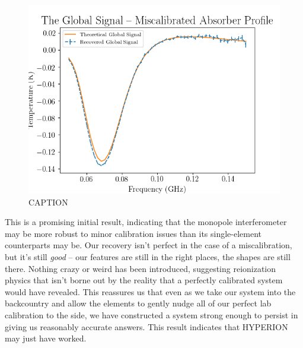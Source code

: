 \begin{figure}
    \begin{center}
    \includegraphics[width=\linewidth]{recovered_signal_diff_abs.png}
    \end{center}
    \caption{
        CAPTION
    }
    \label{fig:recovered-mismatched}
\end{figure}

This is a promising initial result, indicating that the monopole interferometer 
may be more robust to minor calibration issues than its single-element 
counterparts may be. Our recovery isn't perfect in the case of a 
miscalibration, but it's still \emph{good} -- our features are still in the 
right places, the shapes are still there. Nothing crazy or weird has been 
introduced, suggesting reionization physics that isn't borne out by the reality 
that a perfectly calibrated system would have revealed. This reassures us that 
even as we take our system into the backcountry and allow the elements to 
gently nudge all of our perfect lab calibration to the side, we have 
constructed a system strong enough to persist in giving us reasonably accurate 
answers. This result indicates that HYPERION may just have worked.

